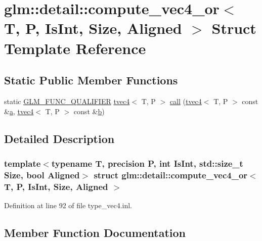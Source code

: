 \hypertarget{structglm_1_1detail_1_1compute__vec4__or}{}\section{glm\+::detail\+::compute\+\_\+vec4\+\_\+or$<$ T, P, Is\+Int, Size, Aligned $>$ Struct Template Reference}
\label{structglm_1_1detail_1_1compute__vec4__or}
\subsection*{Static Public Member Functions}
\begin{DoxyCompactItemize}
\item 
static \mbox{\hyperlink{setup_8hpp_a33fdea6f91c5f834105f7415e2a64407}{G\+L\+M\+\_\+\+F\+U\+N\+C\+\_\+\+Q\+U\+A\+L\+I\+F\+I\+ER}} \mbox{\hyperlink{structglm_1_1tvec4}{tvec4}}$<$ T, P $>$ \mbox{\hyperlink{structglm_1_1detail_1_1compute__vec4__or_a8ecf1e09438d479204235fb4df04c9bb}{call}} (\mbox{\hyperlink{structglm_1_1tvec4}{tvec4}}$<$ T, P $>$ const \&\mbox{\hyperlink{glad_8h_ac8729153468b5dcf13f971b21d84d4e5}{a}}, \mbox{\hyperlink{structglm_1_1tvec4}{tvec4}}$<$ T, P $>$ const \&\mbox{\hyperlink{glad_8h_a6eba317e3cf44d6d26c04a5a8f197dcb}{b}})
\end{DoxyCompactItemize}


\subsection{Detailed Description}
\subsubsection*{template$<$typename T, precision P, int Is\+Int, std\+::size\+\_\+t Size, bool Aligned$>$\newline
struct glm\+::detail\+::compute\+\_\+vec4\+\_\+or$<$ T, P, Is\+Int, Size, Aligned $>$}



Definition at line 92 of file type\+\_\+vec4.\+inl.



\subsection{Member Function Documentation}
\mbox{\label{structglm_1_1detail_1_1compute__vec4__or_a8ecf1e09438d479204235fb4df04c9bb}} 
